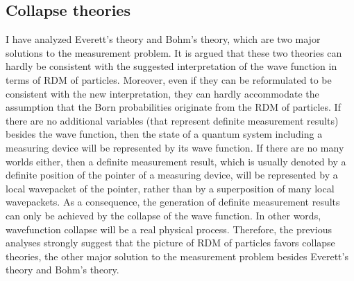 \subsection{Collapse theories}

I have analyzed Everett's theory and Bohm's theory, which are two major solutions to the measurement problem.
It is argued that these two theories can hardly be consistent with the suggested interpretation of the wave function in terms of RDM of particles. 
Moreover, even if they can be reformulated to be consistent with the new interpretation,  they can hardly accommodate the assumption that the Born probabilities originate from the RDM of particles. 
If there are no additional variables (that represent definite measurement results) besides the wave function, then the state of a quantum system including a measuring device will be represented by its wave function. If there are no many worlds either, then a definite measurement result, which is usually denoted by a definite position of the pointer of a measuring device, will be represented by a local wavepacket of the pointer, rather than by a superposition of many local wavepackets. As a consequence, the generation of definite measurement results can only be achieved by the collapse of the wave function. In other words, wavefunction collapse will be a real physical process.
Therefore, the previous analyses strongly suggest that the picture of RDM of particles favors collapse theories, the other major solution to the measurement problem besides Everett's theory and Bohm's theory.

